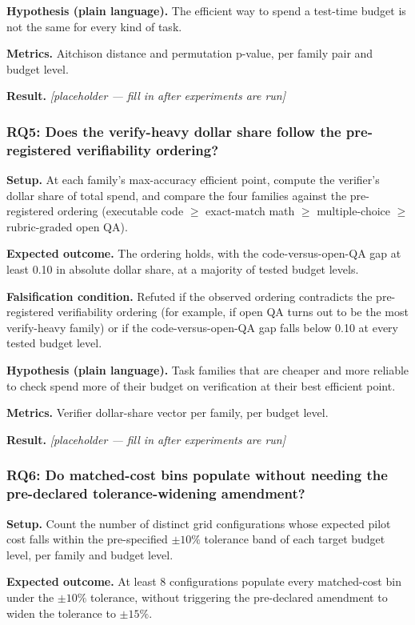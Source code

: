 \documentclass[11pt]{article}
\newcommand{\ph}{\textit{[placeholder --- fill in after experiments are run]}}
\begin{document}
\textbf{Hypothesis (plain language).} The efficient way to spend a test-time budget is not the same for every kind of task.

\textbf{Metrics.} Aitchison distance and permutation p-value, per family pair and budget level.

\textbf{Result.} \ph

\subsubsection{RQ5: Does the verify-heavy dollar share follow the pre-registered verifiability ordering?}
\textbf{Setup.} At each family's max-accuracy efficient point, compute the verifier's dollar share of total spend, and compare the four families against the pre-registered ordering (executable code $\geq$ exact-match math $\geq$ multiple-choice $\geq$ rubric-graded open QA).

\textbf{Expected outcome.} The ordering holds, with the code-versus-open-QA gap at least 0.10 in absolute dollar share, at a majority of tested budget levels.

\textbf{Falsification condition.} Refuted if the observed ordering contradicts the pre-registered verifiability ordering (for example, if open QA turns out to be the most verify-heavy family) or if the code-versus-open-QA gap falls below 0.10 at every tested budget level.

\textbf{Hypothesis (plain language).} Task families that are cheaper and more reliable to check spend more of their budget on verification at their best efficient point.

\textbf{Metrics.} Verifier dollar-share vector per family, per budget level.

\textbf{Result.} \ph

\subsubsection{RQ6: Do matched-cost bins populate without needing the pre-declared tolerance-widening amendment?}
\textbf{Setup.} Count the number of distinct grid configurations whose expected pilot cost falls within the pre-specified $\pm 10\%$ tolerance band of each target budget level, per family and budget level.

\textbf{Expected outcome.} At least 8 configurations populate every matched-cost bin under the $\pm 10\%$ tolerance, without triggering the pre-declared amendment to widen the tolerance to $\pm 15\%$.
\end{document}
